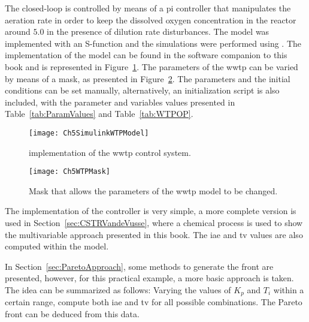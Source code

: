 The closed-loop is controlled by means of a \gls{pi} controller that manipulates the aeration rate in order to keep the dissolved oxygen concentration in the reactor around $5.0$ in the presence of dilution rate disturbances. The model was implemented with an S-function and the simulations were performed using \simulink. The implementation of the model can be found in the software companion to this book and is represented in Figure~\ref{fig:Ch5SimulinkWTPModel}. The parameters of the \gls{wwtp} can be varied by means of a mask, as presented in Figure~\ref{fig:Ch5WTPMask}. The parameters and the initial conditions can be set manually, alternatively, an initialization script is also included, with the parameter and variables values presented in Table~\ref{tab:ParamValues} and Table~\ref{tab:WTPOP}.
%
\begin{figure}[tb]
	\centering
	\texttt{[image: Ch5SimulinkWTPModel]}
	\caption{\simulink{} implementation of the \gls{wwtp} control system.}
	\label{fig:Ch5SimulinkWTPModel}
\end{figure}
%
\begin{figure}[tb]
	\centering
	\texttt{[image: Ch5WTPMask]}
	\caption{Mask that allows the parameters of the \gls{wwtp} model to be changed.}
	\label{fig:Ch5WTPMask}
\end{figure}

The implementation of the controller is very simple, a more complete version is used in Section~\ref{sec:CSTRVandeVusse}, where a chemical process is used to show the multivariable approach presented in this book. The \gls{iae} and \gls{tv} values are also computed within the \simulink{} model.

In Section~\ref{sec:ParetoApproach}, some methods to generate the front are presented, however, for this practical example, a more basic approach is taken. The idea can be summarized as follows: Varying the values of $K_p$ and $T_i$ within a certain range, compute both \gls{iae} and \gls{tv} for all possible combinations. The Pareto front can be deduced from this data.

